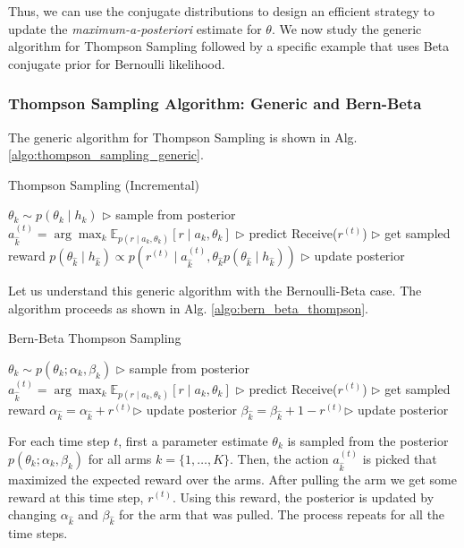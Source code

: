 \documentclass[11pt]{article}
\begin{document}
Thus, we can use the conjugate distributions to design an efficient strategy to update the
\textit{maximum-a-posteriori} estimate for $\theta$. We now study the generic algorithm for
Thompson Sampling followed by a specific example that uses Beta conjugate prior for Bernoulli
likelihood.

\subsubsection{Thompson Sampling Algorithm: Generic and Bern-Beta}
The generic algorithm for Thompson Sampling \cite{thompson1933likelihood} is shown in
Alg. \ref{algo:thompson_sampling_generic}.
\begin{algorithm}
\caption{Thompson Sampling (Incremental)}
\label{algo:thompson_sampling_generic}
\begin{algorithmic}[1]
\STATE $\theta_k \sim p(\theta_k \mid h_k)$ \hfill $\triangleright$ sample from posterior
\STATE $a_{\hat{k}}^{(t)} = \arg \max_k \mathbb{E}_{p(r \mid a_k, \theta_k)} [r \mid a_k, \theta_k]$ \hfill $\triangleright$ predict
\STATE Receive($r^{(t)}$) \hfill $\triangleright$ get sampled reward
\STATE $p(\theta_{\hat{k}} \mid h_{\hat{k}}) \propto p(r^{(t)} \mid a_{\hat{k}}^{(t)}, \theta_{\hat{k}} p(\theta_{\hat{k}} \mid h_{\hat{k}}))$ \hfill $\triangleright$ update posterior
\ENDFOR
\end{algorithmic}
\end{algorithm}

Let us understand this generic algorithm with the Bernoulli-Beta case. The algorithm proceeds
as shown in Alg. \ref{algo:bern_beta_thompson}.
\begin{algorithm}
\caption{Bern-Beta Thompson Sampling}
\label{algo:bern_beta_thompson}
\begin{algorithmic}[1]
\STATE $\theta_k \sim p(\theta_k; \alpha_k, \beta_k)$ \hfill $\triangleright$ sample from posterior
\STATE $a_{\hat{k}}^{(t)} = \arg \max_k \mathbb{E}_{p(r \mid a_k, \theta_k)} [r \mid a_k, \theta_k]$ \hfill $\triangleright$ predict
\STATE Receive($r^{(t)}$) \hfill $\triangleright$ get sampled reward
\STATE  $\alpha_{\hat{k}} = \alpha_{\hat{k}} + r^{(t)}$\hfill $\triangleright$ update posterior
\STATE  $\beta_{\hat{k}} = \beta_{\hat{k}} + 1 - r^{(t)}$\hfill $\triangleright$ update posterior
\ENDFOR
\end{algorithmic}
\end{algorithm}

For each time step $t$, first a parameter estimate $\theta_k$ is sampled from the posterior
$p(\theta_k; \alpha_k, \beta_k)$ for all arms $k = \{ 1, \ldots, K \}$. Then, the action
$a_{\hat{k}}^{(t)}$ is picked that maximized the expected reward over the arms. After pulling
the arm we get some reward at this time step, $r^{(t)}$. Using this reward, the posterior
is updated by changing $\alpha_{\hat{k}}$ and $\beta_{\hat{k}}$ for the arm that was pulled.
The process repeats for all the time steps.
\end{document}

